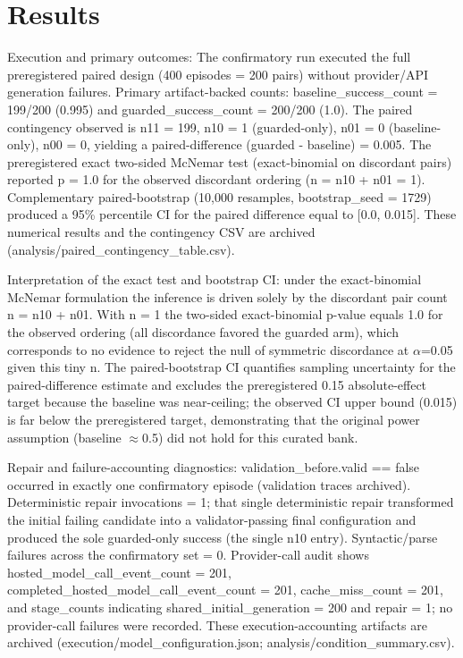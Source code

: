 \documentclass[conference]{IEEEtran}
\begin{document}
\section{Results}
Execution and primary outcomes: The confirmatory run executed the full preregistered paired design (400 episodes = 200 pairs) without provider/API generation failures. Primary artifact-backed counts: baseline\_success\_count = 199/200 (0.995) and guarded\_success\_count = 200/200 (1.0). The paired contingency observed is n11 = 199, n10 = 1 (guarded-only), n01 = 0 (baseline-only), n00 = 0, yielding a paired-difference (guarded - baseline) = 0.005. The preregistered exact two-sided McNemar test (exact-binomial on discordant pairs) reported p = 1.0 for the observed discordant ordering (n = n10 + n01 = 1). Complementary paired-bootstrap (10,000 resamples, bootstrap\_seed = 1729) produced a 95\% percentile CI for the paired difference equal to [0.0, 0.015]. These numerical results and the contingency CSV are archived (analysis/paired\_contingency\_table.csv).

Interpretation of the exact test and bootstrap CI: under the exact-binomial McNemar formulation the inference is driven solely by the discordant pair count n = n10 + n01. With n = 1 the two-sided exact-binomial p-value equals 1.0 for the observed ordering (all discordance favored the guarded arm), which corresponds to no evidence to reject the null of symmetric discordance at \ensuremath{\alpha}=0.05 given this tiny n. The paired-bootstrap CI quantifies sampling uncertainty for the paired-difference estimate and excludes the preregistered 0.15 absolute-effect target because the baseline was near-ceiling; the observed CI upper bound (0.015) is far below the preregistered target, demonstrating that the original power assumption (baseline \ensuremath{\approx}0.5) did not hold for this curated bank.

Repair and failure-accounting diagnostics: validation\_before.valid == false occurred in exactly one confirmatory episode (validation traces archived). Deterministic repair invocations = 1; that single deterministic repair transformed the initial failing candidate into a validator-passing final configuration and produced the sole guarded-only success (the single n10 entry). Syntactic/parse failures across the confirmatory set = 0. Provider-call audit shows hosted\_model\_call\_event\_count = 201, completed\_hosted\_model\_call\_event\_count = 201, cache\_miss\_count = 201, and stage\_counts indicating shared\_initial\_generation = 200 and repair = 1; no provider-call failures were recorded. These execution-accounting artifacts are archived (execution/model\_configuration.json; analysis/condition\_summary.csv).
\end{document}
